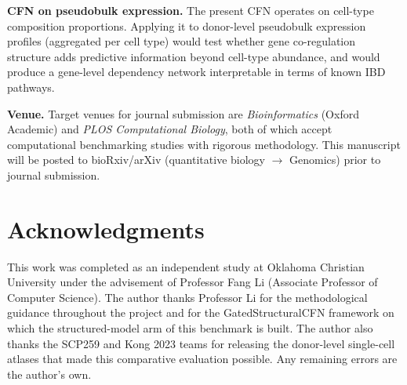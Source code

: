 \documentclass[11pt,letterpaper]{article}
\begin{document}
\textbf{CFN on pseudobulk expression.} The present CFN operates on
cell-type composition proportions. Applying it to donor-level pseudobulk
expression profiles (aggregated per cell type) would test whether gene
co-regulation structure adds predictive information beyond cell-type abundance,
and would produce a gene-level dependency network interpretable in terms of
known IBD pathways.

\textbf{Venue.} Target venues for journal submission are
\textit{Bioinformatics} (Oxford Academic) and \textit{PLOS Computational
Biology}, both of which accept computational benchmarking studies with
rigorous methodology. This manuscript will be posted to bioRxiv/arXiv
(quantitative biology $\rightarrow$ Genomics) prior to journal submission.


\section*{Acknowledgments}

This work was completed as an independent study at Oklahoma Christian
University under the advisement of Professor Fang Li (Associate Professor of
Computer Science). The author thanks Professor Li for the methodological
guidance throughout the project and for the GatedStructuralCFN framework
\citep{li2023structural} on which the structured-model arm of this benchmark
is built. The author also thanks the SCP259 \citep{smillie2019intra} and
Kong 2023 \citep{kong2023single} teams for releasing the donor-level
single-cell atlases that made this comparative evaluation possible. Any
remaining errors are the author's own.


\newpage


\end{document}

